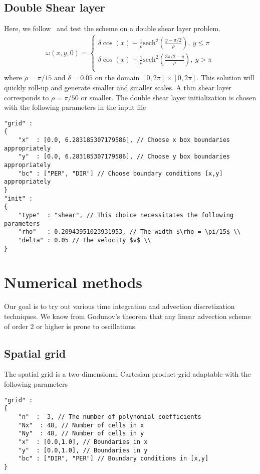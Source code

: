\subsection{ Double Shear layer}
Here, we follow~\cite{Liu2000} and test the scheme on a double shear layer problem.
\begin{align}
    \omega(x,y,0) = \begin{cases}
        \delta \cos(x) - \frac{1}{\rho} \text{sech}^2 \left(\frac{y-\pi/2}{\rho}\right),\ y \leq \pi \\
        \delta \cos(x) + \frac{1}{\rho} \text{sech}^2 \left(\frac{3\pi/2-y}{\rho}\right),\ y > \pi \\
    \end{cases}
\end{align}
where $\rho = \pi/15$ and $\delta =0.05$ on the domain $[0,2\pi]\times [0,2\pi]$.
This solution will quickly roll-up and generate smaller and smaller scales.
A thin shear layer corresponds to $\rho = \pi/50$ or smaller.
The double shear layer initialization is chosen with the following parameters in the input file
\begin{verbatim}
"grid" :
{
    "x"  : [0.0, 6.283185307179586], // Choose x box boundaries appropriately
    "y"  : [0.0, 6.283185307179586], // Choose y box boundaries appropriately
    "bc" : ["PER", "DIR"] // Choose boundary conditions [x,y] appropriately
}
"init" :
{
    "type"  : "shear", // This choice necessitates the following parameters
    "rho"   : 0.20943951023931953, // The width $\rho = \pi/15$ \\
    "delta" : 0.05 // The velocity $v$ \\
}
\end{verbatim}

\section{Numerical methods}
Our goal is to try out various time integration and advection discretization techniques.
We know from Godunov's theorem
that any linear advection scheme of order 2 or higher is prone to oscillations.
\subsection{Spatial grid}
The spatial grid is a two-dimensional Cartesian product-grid adaptable with the following parameters
\begin{verbatim}
"grid" :
{
    "n"  :  3, // The number of polynomial coefficients
    "Nx"  : 48, // Number of cells in x
    "Ny"  : 48, // Number of cells in y
    "x"  : [0.0,1.0], // Boundaries in x
    "y"  : [0.0,1.0], // Boundaries in y
    "bc" : ["DIR", "PER"] // Boundary conditions in [x,y]
}
\end{verbatim}
